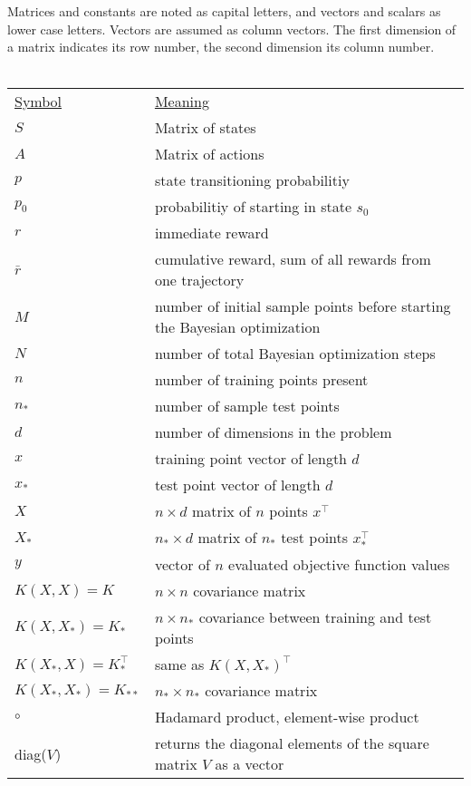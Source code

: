 Matrices and constants are noted as capital letters, and vectors and scalars as lower case letters. Vectors are assumed as column vectors. The first dimension of a matrix indicates its row number, the second dimension its column number.\\
\\
\begin{tabular}{l l}
    \underline{Symbol} & \underline{Meaning}\\
    $S$ & Matrix of states\\
    $A$ & Matrix of actions\\
    $p$ & state transitioning probabilitiy\\
    $p_0$ & probabilitiy of starting in state $s_0$\\
    $r$ & immediate reward\\
    $\bar{r}$ & cumulative reward, sum of all rewards from one trajectory\\
    $M$ & number of initial sample points before starting the Bayesian optimization\\
    $N$ & number of total Bayesian optimization steps\\
    $n$ & number of training points present\\
    $n_*$ & number of sample test points\\
    $d$ & number of dimensions in the problem\\
    $x$ & training point vector of length $d$\\
    $x_*$ & test point vector of length $d$\\
    $X$ & $n \times d$ matrix of $n$ points $x^{\top}$\\
    $X_*$ & $n_* \times d$ matrix of $n_*$ test points $x^{\top}_*$\\
    $y$ & vector of $n$ evaluated objective function values\\
    $K(X,X) = K$ & $n \times n$ covariance matrix\\
    $K(X,X_*) = K_*$ & $n \times n_*$ covariance between training and test points\\
    $K(X_*,X) = K_*^\top$ & same as $K(X,X_*)^{\top}$\\
    $K(X_*,X_*) = K_{**}$ & $n_* \times n_*$ covariance matrix\\
    $\circ$ & Hadamard product, element-wise product\\
    diag($V$) & returns the diagonal elements of the square matrix $V$ as a vector\\
\end{tabular}
